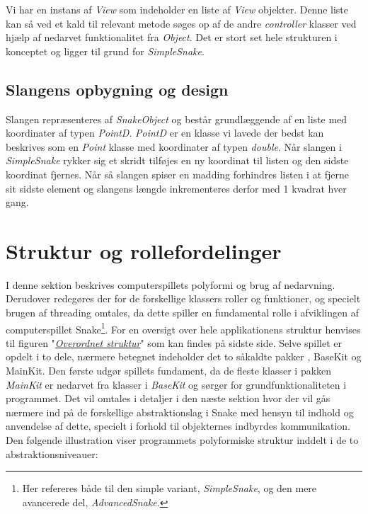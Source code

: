 \documentclass[]{article}
\begin{document}
	Vi har en instans af \textit{View} som indeholder en liste af \textit{View} objekter. Denne liste kan så ved et kald til relevant metode søges op af de andre \textit{controller} klasser ved hjælp af nedarvet funktionalitet fra \textit{Object}. Det er stort set hele strukturen i konceptet og ligger til grund for \textit{SimpleSnake}.
	
	
	\subsection{Slangens opbygning og design}
	
	Slangen repræsenteres af \textit{SnakeObject} og består grundlæggende af en liste med koordinater af typen \textit{PointD}. \textit{PointD} er en klasse vi lavede der bedst kan beskrives som en \textit{Point} klasse med koordinater af typen \textit{double}. Når slangen i \textit{SimpleSnake} rykker sig et skridt tilføjes en ny koordinat til listen og den sidste koordinat fjernes. Når så slangen spiser en madding forhindres listen i at fjerne sit sidste element og slangens længde inkrementeres derfor med 1 kvadrat hver gang.
	
	
	\section{Struktur og rollefordelinger}
	
	I denne sektion beskrives computerspillets polyformi og brug af nedarvning. Derudover redegøres der for de forskellige klassers roller og funktioner, og specielt brugen af threading omtales, da dette spiller en fundamental rolle i afviklingen af computerspillet Snake\footnote{Her refereres både til den simple variant, \textit{SimpleSnake}, og den mere avancerede del, \textit{AdvancedSnake}.}. For en oversigt over hele applikationens struktur henvises til figuren "\textit{\hyperref[fig:structure]{Overordnet struktur}}" som kan findes på sidste side.
	Selve spillet er opdelt i to dele, nærmere betegnet indeholder det to såkaldte pakker , BaseKit og MainKit. Den første udgør spillets fundament, da de fleste klasser i pakken \textit{MainKit} er nedarvet fra klasser i \textit{BaseKit} og sørger for grundfunktionaliteten i programmet. Det vil omtales i detaljer i den næste sektion hvor der vil gås nærmere ind på de forskellige abstraktionslag i Snake med hensyn til indhold og anvendelse af dette, specielt i forhold til objekternes indbyrdes kommunikation. Den følgende illustration viser programmets polyformiske struktur inddelt i de to abstraktionsniveauer:
	
\end{document}
